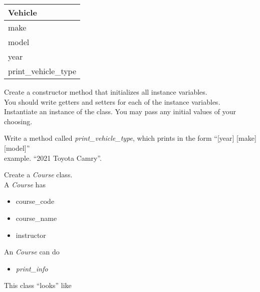 \documentclass{article}
\newcommand{\tab}{\hspace*{0.25in}}
\begin{document}
\begin{enumerate}
\begin{minipage}{.4\textwidth}
		\vspace*{1em}
		\begin{tabular}{|l|}
			\hline Vehicle\\ \hline
			make\\ model\\ year\\ \hline
			print\_vehicle\_type \\  \hline
		\end{tabular}
	\end{minipage}

	\vspace*{2ex}
	Create a constructor method that initializes all instance variables.\\
	You should write getters and setters for each of the instance variables.\\
	Instantiate an instance of the class. You may pass any initial values of your choosing.

	Write a method called \textit{print\_vehicle\_type}, which prints in the form ``[year] [make] [model]''\\
	example. ``2021 Toyota Camry''.\\




	\begin{minipage}{.6\textwidth}
		\item Create a \textit{Course} class.\\
		A \textit{Course} has
		\begin{itemize}
			\item course\_code 
			\item course\_name
			\item instructor	
		\end{itemize}

		An \textit{Course} can do
		\begin{itemize}
			\item \textit{print\_info}
		\end{itemize}	
	\end{minipage}
	\begin{minipage}{.4\textwidth}
		This class ``looks'' like 
				

\end{minipage}
\end{enumerate}
\end{document}
